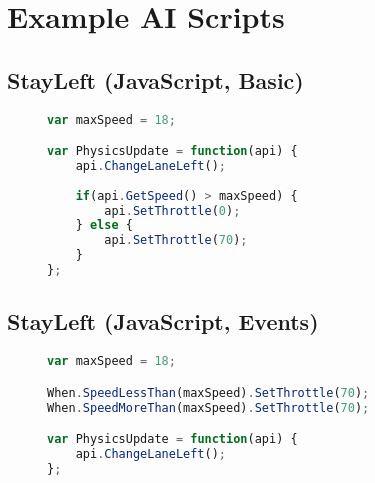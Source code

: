 \section{Example AI Scripts}
\subsection{StayLeft (JavaScript, Basic)}
\begin{figure}[H]
\begin{lstlisting}[language=JavaScript]
var maxSpeed = 18;

var PhysicsUpdate = function(api) {
    api.ChangeLaneLeft();
    
    if(api.GetSpeed() > maxSpeed) {
        api.SetThrottle(0);
    } else {
        api.SetThrottle(70);
    }
};
\end{lstlisting}
\end{figure}

\subsection{StayLeft (JavaScript, Events)}
\begin{figure}[H]
\begin{lstlisting}[language=JavaScript]
var maxSpeed = 18;

When.SpeedLessThan(maxSpeed).SetThrottle(70);
When.SpeedMoreThan(maxSpeed).SetThrottle(70);

var PhysicsUpdate = function(api) {
    api.ChangeLaneLeft();
};
\end{lstlisting}
\end{figure}

